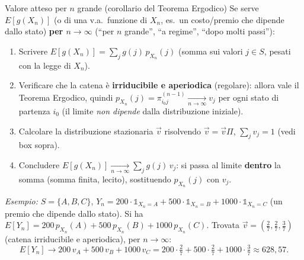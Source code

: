 \documentclass[11pt]{article}
\begin{document}
\begin{concetto}[barPurple]{Valore atteso per $n$ grande (corollario del Teorema Ergodico)}
Se serve $E[g(X_n)]$ (o di una v.a.\ funzione di $X_n$, es.\ un costo/premio che dipende dallo stato) \textbf{per $n\to\infty$} (``per $n$ grande'', ``a regime'', ``dopo molti passi''):
\begin{enumerate}[leftmargin=1.4em,itemsep=1pt,topsep=2pt]
\item Scrivere $E[g(X_n)]=\sum_j g(j)\,p_{X_n}(j)$ (somma sui valori $j\in S$, pesati con la legge di $X_n$).
\item Verificare che la catena \`e \textbf{irriducibile e aperiodica} (regolare): allora vale il Teorema Ergodico, quindi $p_{X_n}(j)=\pi_{i_0 j}^{(n-1)}\xrightarrow[n\to\infty]{} v_j$ per ogni stato di partenza $i_0$ (il limite \emph{non dipende} dalla distribuzione iniziale).
\item Calcolare la distribuzione stazionaria $\vec v$ risolvendo $\vec v=\vec v\Pi$, $\sum_j v_j=1$ (vedi box sopra).
\item Concludere $E[g(X_n)] \xrightarrow[n\to\infty]{} \sum_j g(j)\,v_j$: si passa al limite \textbf{dentro} la somma (somma finita, lecito), sostituendo $p_{X_n}(j)$ con $v_j$.
\end{enumerate}
\emph{Esempio:} $S=\{A,B,C\}$, $Y_n=200\cdot\mathbb{1}_{X_n=A}+500\cdot\mathbb{1}_{X_n=B}+1000\cdot\mathbb{1}_{X_n=C}$ (un premio che dipende dallo stato). Si ha $E[Y_n]=200\,p_{X_n}(A)+500\,p_{X_n}(B)+1000\,p_{X_n}(C)$. Trovata $\vec v=(\tfrac27,\tfrac27,\tfrac37)$ (catena irriducibile e aperiodica), per $n\to\infty$:
\[ E[Y_n] \to 200\,v_A+500\,v_B+1000\,v_C = 200\cdot\tfrac27+500\cdot\tfrac27+1000\cdot\tfrac37 \approx 628{,}57. \]
\end{concetto}
\end{document}
